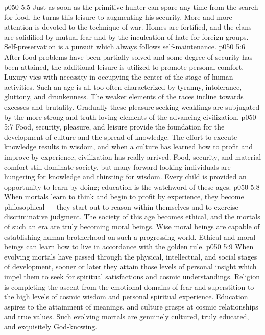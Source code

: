 \vs p050 5:5 \pc {}\bibnobreakspace {} Just as soon as the primitive hunter can spare any time from the search for food, he turns this leisure to augmenting his security. More and more attention is devoted to the technique of war. Homes are fortified, and the clans are solidified by mutual fear and by the inculcation of hate for foreign groups. Self\hyp{}preservation is a pursuit which always follows self\hyp{}maintenance.
\vs p050 5:6 \pc {}\bibnobreakspace {} After food problems have been partially solved and some degree of security has been attained, the additional leisure is utilized to promote personal comfort. Luxury vies with necessity in occupying the center of the stage of human activities. Such an age is all too often characterized by tyranny, intolerance, gluttony, and drunkenness. The weaker elements of the races incline towards excesses and brutality. Gradually these pleasure\hyp{}seeking weaklings are subjugated by the more strong and truth\hyp{}loving elements of the advancing civilization.
\vs p050 5:7 \pc {}\bibnobreakspace {} Food, security, pleasure, and leisure provide the foundation for the development of culture and the spread of knowledge. The effort to execute knowledge results in wisdom, and when a culture has learned how to profit and improve by experience, civilization has really arrived. Food, security, and material comfort still dominate society, but many forward\hyp{}looking individuals are hungering for knowledge and thirsting for wisdom. Every child is provided an opportunity to learn by doing; education is the watchword of these ages.
\vs p050 5:8 \pc {}\bibnobreakspace {} When mortals learn to think and begin to profit by experience, they become philosophical --- they start out to reason within themselves and to exercise discriminative judgment. The society of this age becomes ethical, and the mortals of such an era are truly becoming moral beings. Wise moral beings are capable of establishing human brotherhood on such a progressing world. Ethical and moral beings can learn how to live in accordance with the golden rule.
\vs p050 5:9 \pc {}\bibnobreakspace {} When evolving mortals have passed through the physical, intellectual, and social stages of development, sooner or later they attain those levels of personal insight which impel them to seek for spiritual satisfactions and cosmic understandings. Religion is completing the ascent from the emotional domains of fear and superstition to the high levels of cosmic wisdom and personal spiritual experience. Education aspires to the attainment of meanings, and culture grasps at cosmic relationships and true values. Such evolving mortals are genuinely cultured, truly educated, and exquisitely God\hyp{}knowing.
